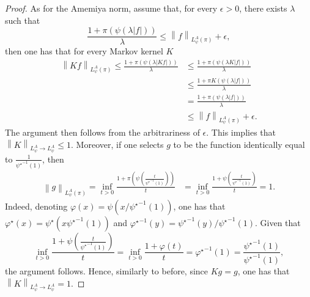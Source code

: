 \documentclass[11pt]{article}
\theoremstyle{plain}
\theoremstyle{remark}
\begin{document}
\begin{proof}
    As for the Amemiya norm, assume that, for every $\epsilon>0$, there exists $\lambda$ such that
    \begin{equation}
        \frac{1+\pi(\psi(\lambda|f|))}{\lambda} \leq \left\lVert f \right\rVert_{L^A_\psi(\pi)} + \epsilon,
    \end{equation}
    then one has that for every Markov kernel $K$ 
    \begin{align}
       \left\lVert Kf \right\rVert_{L^A_\psi(\pi)} \leq  \frac{1+\pi(\psi(\lambda |Kf|))}{\lambda} &\leq \frac{1+\pi(\psi(\lambda K |f|))}{\lambda} \\
       &\leq \frac{1+\pi K(\psi(\lambda  |f|))}{\lambda} \\
       &= \frac{1+\pi(\psi(\lambda  |f|))}{\lambda} \\
       &\leq \left\lVert f \right\rVert_{L^A_\psi(\pi)} + \epsilon.
    \end{align}
    The argument then follows from the arbitrariness of $\epsilon$. This implies that $\left\lVert K \right\rVert_{L_\psi^A \to L_\psi^A} \leq 1$.    Moreover,  if one selects $g$ to be the function identically equal to $\frac{1}{{\psi^{\star}}^{-1}(1)}$, then 
    \begin{align}
        \left\lVert g \right\rVert_{L^A_\psi(\pi)} =  \inf_{t>0} \frac{1+\pi\left(\psi\left(\frac{t}{{\psi^{\star}}^{-1}(1)}\right)\right)}{t} 
        &= \inf_{t>0} \frac{1+\psi\left(\frac{t}{{\psi^{\star}}^{-1}(1)}\right)}{t} = 1.
    \end{align}
    Indeed, denoting $\varphi(x) = \psi(x/{\psi^\star}^{-1}(1))$, one has that $\varphi^\star(x) = \psi^\star(x{\psi^\star}^{-1}(1) )$ and ${\varphi^\star}^{-1}(y) = {\psi^\star}^{-1}(y)/{\psi^\star}^{-1}(1)$. Given that
    \begin{equation}
        \inf_{t>0} \frac{1+\psi\left(\frac{t}{{\psi^{\star}}^{-1}(1)}\right)}{t} = \inf_{t>0} \frac{1+\varphi(t)}{t} = {\varphi^\star}^{-1}(1) = \frac{{\psi^\star}^{-1}(1)}{{\psi^\star}^{-1}(1)},
    \end{equation}
    the argument follows.
    Hence, similarly to before, since $Kg=g$, one has that $\left\lVert K \right\rVert_{L_\psi^A \to L_\psi^A} = 1$.
\end{proof}
    
\end{document}
